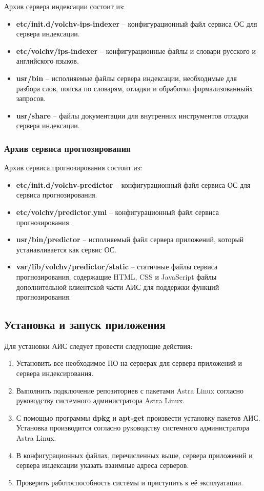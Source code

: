 Архив сервера индексации состоит из:
\begin{itemize}
\item \textbf{etc/init.d/volchv-ips-indexer} -- конфигурационный файл сервиса ОС для сервера индексации. 
\item \textbf{etc/volchv/ips-indexer} -- конфигурационные файлы и словари русского и английского языков.
\item \textbf{usr/bin} -- исполняемые файлы сервера индексации, необходимые для разбора слов, поиска по словарям, отладки и обработки формализованныйх запросов. 
\item \textbf{usr/share} -- файлы документации для внутренних инструментов отладки сервера индексации.
\end{itemize}

\subsubsection{Архив сервиса прогнозирования} \hfill

Архив сервиса прогнозирования состоит из:
\begin{itemize}
\item \textbf{etc/init.d/volchv-predictor} -- конфигурационный файл сервиса ОС для сервиса прогнозирования. 
\item \textbf{etc/volchv/predictor.yml} -- конфигурационный файл сервиса прогнозирования.
\item \textbf{usr/bin/predictor} -- исполняемый файл сервера приложений, который устанавливается как сервис ОС. 
\item \textbf{var/lib/volchv/predictor/static} -- статичные файлы сервиса прогнозирования, содержащие HTML, CSS и JavaScript файлы дополнительной клиентской части АИС для поддержки функций прогнозирования.
\end{itemize}

\subsection{Установка и запуск приложения}

Для установки АИС следует провести следующие действия:
\begin{enumerate}
\item Установить все необходимое ПО на серверах для сервера приложений и сервера индексирования.
\item Выполнить подключение репозиториев с пакетами Astra Linux согласно руководству системного администратора Astra Linux.
\item С помощью программы \textbf{dpkg} и \textbf{apt-get} произвести установку пакетов АИС. Установка производится согласно руководству системного администратора Astra Linux.
\item В конфигурационных файлах, перечисленных выше, сервера приложений и сервера индексации указать взаимные адреса серверов.
\item Проверить работоспособность системы и приступить к её эксплуатации.
\end{enumerate}
